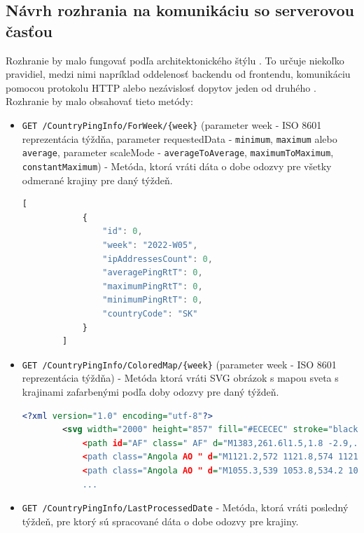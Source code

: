 \subsection{Návrh rozhrania na komunikáciu so serverovou časťou}
Rozhranie by malo fungovať podľa architektonického štýlu . To určuje niekoľko pravidiel, medzi nimi napríklad oddelenosť backendu od frontendu, 
komunikáciu pomocou protokolu HTTP alebo nezávislosť dopytov jeden od druhého \cite{rest}. Rozhranie by malo obsahovať tieto metódy:
\begin{itemize}
    \item \verb|GET /CountryPingInfo/ForWeek/{week}| (parameter week - ISO 8601 reprezentácia týždňa, parameter requestedData - \lstinline{minimum},
     \lstinline{maximum} alebo \lstinline{average}, parameter scaleMode - \lstinline{averageToAverage}, \lstinline{maximumToMaximum}, \lstinline{constantMaximum})
      - Metóda, ktorá vráti dáta o dobe odozvy pre všetky odmerané krajiny pre daný týždeň. 
    \begin{lstlisting}[language={TypeScript},caption={Vzorový výstup z endpointu},label=alg:get_country_ping_info_example]
        [
            {
                "id": 0,
                "week": "2022-W05",
                "ipAddressesCount": 0,
                "averagePingRtT": 0,
                "maximumPingRtT": 0,
                "minimumPingRtT": 0,
                "countryCode": "SK"
            }
        ]
    \end{lstlisting}
    \item \verb|GET /CountryPingInfo/ColoredMap/{week}| (parameter week - ISO 8601 reprezentácia týždňa) - Metóda ktorá vráti SVG obrázok s mapou sveta s krajinami zafarbenými podľa doby odozvy pre daný týždeň. 
    \begin{lstlisting}[language={XML},caption={Vzorový výstup z endpointu},label=alg:get_country_ping_info_map_example]
        <?xml version="1.0" encoding="utf-8"?>
        <svg width="2000" height="857" fill="#ECECEC" stroke="black" stroke-width=".2"...
            <path id="AF" class=" AF" d="M1383,261.6l1.5,1.8 -2.9,.8 -2.4,1.1 -5.9,.8 -5.3,1.3 ...
            <path class="Angola AO " d="M1121.2,572 1121.8,574 1121.1,577.1 1122,580.1 1121.1, ...
            <path class="Angola AO " d="M1055.3,539 1053.8,534.2 1056.1,531.4 1057.8,530.3 ...
            ...
    \end{lstlisting}
    \item \verb|GET /CountryPingInfo/LastProcessedDate| - Metóda, ktorá vráti posledný týždeň, pre ktorý sú spracované dáta o dobe odozvy pre krajiny.

\end{itemize}
